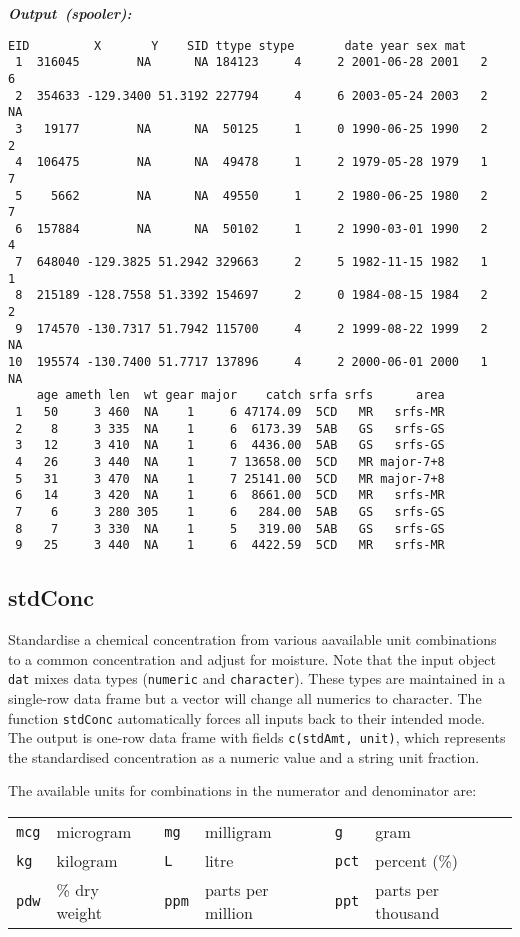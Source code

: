 \documentclass[letterpaper,12pt,fleqn]{article}
\def\tab{\hspace{0.5 in}}
\newcommand{\code}[1]{\small\texttt{#1}\normalsize}
\newcommand\results[1]{    %
	\textbf{\emph{Output~(#1):}}\\ \vspace{3 pt}
}
\begin{document}
\begin{outputbox}
\results{spooler}
\begin{Verbatim}[fontsize=\footnotesize]
       EID         X       Y    SID ttype stype       date year sex mat
 1  316045        NA      NA 184123     4     2 2001-06-28 2001   2   6
 2  354633 -129.3400 51.3192 227794     4     6 2003-05-24 2003   2  NA
 3   19177        NA      NA  50125     1     0 1990-06-25 1990   2   2
 4  106475        NA      NA  49478     1     2 1979-05-28 1979   1   7
 5    5662        NA      NA  49550     1     2 1980-06-25 1980   2   7
 6  157884        NA      NA  50102     1     2 1990-03-01 1990   2   4
 7  648040 -129.3825 51.2942 329663     2     5 1982-11-15 1982   1   1
 8  215189 -128.7558 51.3392 154697     2     0 1984-08-15 1984   2   2
 9  174570 -130.7317 51.7942 115700     4     2 1999-08-22 1999   2  NA
10  195574 -130.7400 51.7717 137896     4     2 2000-06-01 2000   1  NA
    age ameth len  wt gear major    catch srfa srfs      area
 1   50     3 460  NA    1     6 47174.09  5CD   MR   srfs-MR
 2    8     3 335  NA    1     6  6173.39  5AB   GS   srfs-GS
 3   12     3 410  NA    1     6  4436.00  5AB   GS   srfs-GS
 4   26     3 440  NA    1     7 13658.00  5CD   MR major-7+8
 5   31     3 470  NA    1     7 25141.00  5CD   MR major-7+8
 6   14     3 420  NA    1     6  8661.00  5CD   MR   srfs-MR
 7    6     3 280 305    1     6   284.00  5AB   GS   srfs-GS
 8    7     3 330  NA    1     5   319.00  5AB   GS   srfs-GS
 9   25     3 440  NA    1     6  4422.59  5CD   MR   srfs-MR
\end{Verbatim}
\end{outputbox}

\subsection {stdConc}

\tab Standardise a chemical concentration from various aavailable unit combinations to a common concentration and adjust for moisture.
Note that the input object \code{dat} mixes data types (\code{numeric} and \code{character}). 
These types are maintained in a single-row data frame but a vector will change all numerics to character. 
The function \code{stdConc} automatically forces all inputs back to their intended mode.
The output is one-row data frame with fields \code{c(stdAmt, unit)}, which represents the standardised concentration as a numeric value and a string unit fraction.

The available units for combinations in the numerator and denominator are:\vspace*{0.5ex}
\begin{tabular}{llllll}
    \code{mcg} & microgram     & \code{mg}  & milligram         & \code{g}   & gram\\
    \code{kg}  & kilogram      & \code{L}   & litre             & \code{pct} & percent (\%)\\
    \code{pdw} & \% dry weight & \code{ppm} & parts per million & \code{ppt} & parts per thousand\\
\end{tabular}
\end{document}
